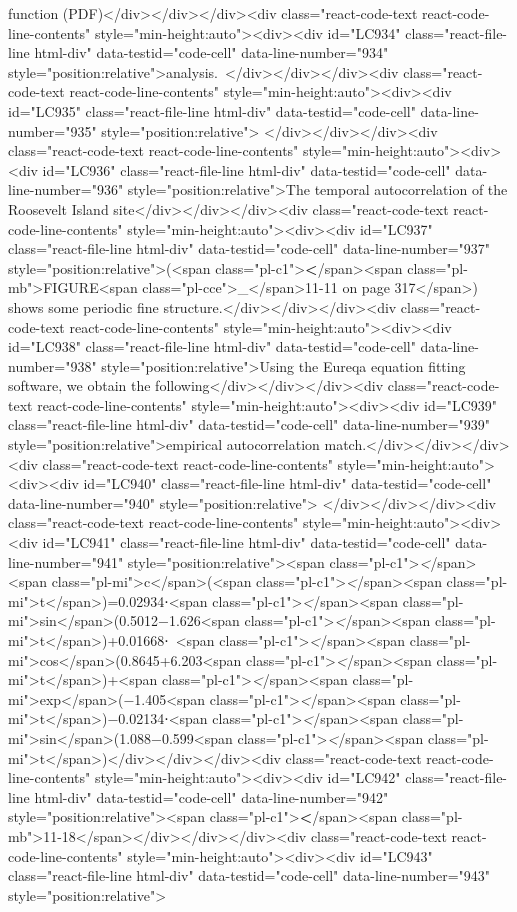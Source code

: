 {{{{{{function (PDF)</div></div></div><div class="react-code-text react-code-line-contents" style="min-height:auto"><div><div id="LC934" class="react-file-line html-div" data-testid="code-cell" data-line-number="934" style="position:relative">analysis.~</div></div></div><div class="react-code-text react-code-line-contents" style="min-height:auto"><div><div id="LC935" class="react-file-line html-div" data-testid="code-cell" data-line-number="935" style="position:relative">
</div></div></div><div class="react-code-text react-code-line-contents" style="min-height:auto"><div><div id="LC936" class="react-file-line html-div" data-testid="code-cell" data-line-number="936" style="position:relative">The temporal autocorrelation of the Roosevelt Island site</div></div></div><div class="react-code-text react-code-line-contents" style="min-height:auto"><div><div id="LC937" class="react-file-line html-div" data-testid="code-cell" data-line-number="937" style="position:relative">(<span class="pl-c1">\textbf</span>{<span class="pl-mb">FIGURE<span class="pl-cce">\_</span>11-11 on page 317</span>}) shows some periodic fine structure.</div></div></div><div class="react-code-text react-code-line-contents" style="min-height:auto"><div><div id="LC938" class="react-file-line html-div" data-testid="code-cell" data-line-number="938" style="position:relative">Using the Eureqa equation fitting software, we obtain the following</div></div></div><div class="react-code-text react-code-line-contents" style="min-height:auto"><div><div id="LC939" class="react-file-line html-div" data-testid="code-cell" data-line-number="939" style="position:relative">empirical autocorrelation match.</div></div></div><div class="react-code-text react-code-line-contents" style="min-height:auto"><div><div id="LC940" class="react-file-line html-div" data-testid="code-cell" data-line-number="940" style="position:relative">
</div></div></div><div class="react-code-text react-code-line-contents" style="min-height:auto"><div><div id="LC941" class="react-file-line html-div" data-testid="code-cell" data-line-number="941" style="position:relative"><span class="pl-c1">\emph</span>{<span class="pl-mi">c</span>}(<span class="pl-c1">\emph</span>{<span class="pl-mi">t</span>})=0.02934⋅<span class="pl-c1">\emph</span>{<span class="pl-mi">sin</span>}(0.5012−1.626<span class="pl-c1">\emph</span>{<span class="pl-mi">t</span>})+0.01668⋅~<span class="pl-c1">\emph</span>{<span class="pl-mi">cos</span>}(0.8645+6.203<span class="pl-c1">\emph</span>{<span class="pl-mi">t</span>})+<span class="pl-c1">\emph</span>{<span class="pl-mi">exp</span>}(−1.405<span class="pl-c1">\emph</span>{<span class="pl-mi">t</span>})−0.02134⋅<span class="pl-c1">\emph</span>{<span class="pl-mi">sin</span>}(1.088−0.599<span class="pl-c1">\emph</span>{<span class="pl-mi">t</span>})</div></div></div><div class="react-code-text react-code-line-contents" style="min-height:auto"><div><div id="LC942" class="react-file-line html-div" data-testid="code-cell" data-line-number="942" style="position:relative"><span class="pl-c1">\textbf</span>{<span class="pl-mb">11-18</span>}</div></div></div><div class="react-code-text react-code-line-contents" style="min-height:auto"><div><div id="LC943" class="react-file-line html-div" data-testid="code-cell" data-line-number="943" style="position:relative">
}}}}}}
